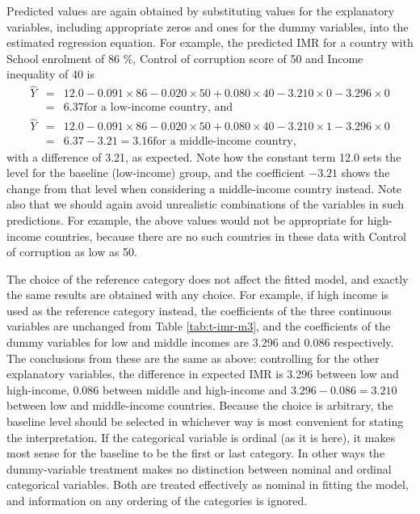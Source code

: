 \documentclass[11pt,a4paper,openany]{book}
\begin{document}
Predicted values are again obtained by substituting values for the
explanatory variables, including appropriate zeros and ones for the
dummy variables, into the estimated regression equation. For example,
the predicted IMR for a country with School enrolment of 86 \%, Control
of corruption score of 50 and Income inequality of 40 is
\[\begin{aligned}
\hat{Y}&=&12.0-0.091\times 86-0.020\times 50+0.080\times 40-3.210\times
0-3.296\times 0\\
&=&
6.37 \text{for a low-income country, and }\\
\hat{Y}&=&12.0-0.091\times 86-0.020\times 50+0.080\times 40-3.210\times
1-3.296\times 0\\
&=&
6.37-3.21=3.16 \text{for a middle-income country,}\end{aligned}\] with a
difference of 3.21, as expected. Note how the constant term 12.0 sets
the level for the baseline (low-income) group, and the coefficient
\(-3.21\) shows the change from that level when considering a
middle-income country instead. Note also that we should again avoid
unrealistic combinations of the variables in such predictions. For
example, the above values would not be appropriate for high-income
countries, because there are no such countries in these data with
Control of corruption as low as 50.

The choice of the reference category does not affect the fitted model,
and exactly the same results are obtained with any choice. For example,
if high income is used as the reference category instead, the
coefficients of the three continuous variables are unchanged from Table
\ref{tab:t-imr-m3}, and the coefficients of the dummy variables for low
and middle incomes are 3.296 and 0.086 respectively. The conclusions
from these are the same as above: controlling for the other explanatory
variables, the difference in expected IMR is 3.296 between low and
high-income, 0.086 between middle and high-income and
\(3.296-0.086=3.210\) between low and middle-income countries. Because
the choice is arbitrary, the baseline level should be selected in
whichever way is most convenient for stating the interpretation. If the
categorical variable is ordinal (as it is here), it makes most sense for
the baseline to be the first or last category. In other ways the
dummy-variable treatment makes no distinction between nominal and
ordinal categorical variables. Both are treated effectively as nominal
in fitting the model, and information on any ordering of the categories
is ignored.
\end{document}

